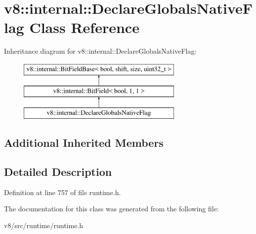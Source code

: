 \hypertarget{classv8_1_1internal_1_1DeclareGlobalsNativeFlag}{}\section{v8\+:\+:internal\+:\+:Declare\+Globals\+Native\+Flag Class Reference}
\label{classv8_1_1internal_1_1DeclareGlobalsNativeFlag}
Inheritance diagram for v8\+:\+:internal\+:\+:Declare\+Globals\+Native\+Flag\+:\begin{figure}[H]
\begin{center}
\leavevmode
\includegraphics[height=3.000000cm]{classv8_1_1internal_1_1DeclareGlobalsNativeFlag}
\end{center}
\end{figure}
\subsection*{Additional Inherited Members}


\subsection{Detailed Description}


Definition at line 757 of file runtime.\+h.



The documentation for this class was generated from the following file\+:\begin{DoxyCompactItemize}
\item 
v8/src/runtime/runtime.\+h\end{DoxyCompactItemize}
